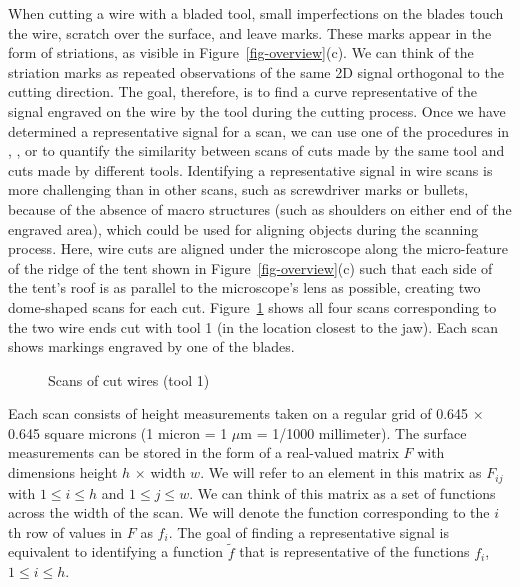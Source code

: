 \documentclass[
  authoryear,
  preprint,
  5p,
  twocolumn]{elsarticle}
\begin{document}
When cutting a wire with a bladed tool, small imperfections on the
blades touch the wire, scratch over the surface, and leave marks. These
marks appear in the form of striations, as visible in
Figure~\ref{fig-overview}(c). We can think of the striation marks as
repeated observations of the same 2D signal orthogonal to the cutting
direction. The goal, therefore, is to find a curve representative of the
signal engraved on the wire by the tool during the cutting process. Once
we have determined a representative signal for a scan, we can use one of
the procedures in \citet{hareAutomaticMatchingBullet2017},
\citet{chumbleyValidationToolMark2010}, or
\citet{juJournalOpenSourceImplementation2022} to quantify the similarity
between scans of cuts made by the same tool and cuts made by different
tools. Identifying a representative signal in wire scans is more
challenging than in other scans, such as screwdriver marks or bullets,
because of the absence of macro structures (such as shoulders on either
end of the engraved area), which could be used for aligning objects
during the scanning process. Here, wire cuts are aligned under the
microscope along the micro-feature of the ridge of the tent shown in
Figure~\ref{fig-overview}(c) such that each side of the tent's roof is
as parallel to the microscope's lens as possible, creating two
dome-shaped scans for each cut. Figure~\ref{fig-T1W} shows all four
scans corresponding to the two wire ends cut with tool 1 (in the
location closest to the jaw). Each scan shows markings engraved by one
of the blades.

\begin{figure}


\caption{\label{fig-T1W}Scans of cut wires (tool 1)}

\end{figure}%

Each scan consists of height measurements taken on a regular grid of
0.645 \(\times\) 0.645 square microns (1 micron = 1 \(\mu\)m = 1/1000
millimeter). The surface measurements can be stored in the form of a
real-valued matrix \(F\) with dimensions height \(h\) \(\times\) width
\(w\). We will refer to an element in this matrix as \(F_{ij}\) with
\(1 \le i \le h\) and \(1 \le j \le w\). We can think of this matrix as
a set of functions across the width of the scan. We will denote the
function corresponding to the \(i\)th row of values in \(F\) as \(f_i\).
The goal of finding a representative signal is equivalent to identifying
a function \(\tilde{f}\) that is representative of the functions
\(f_i\), \(1 \le i \le h\).
\end{document}
